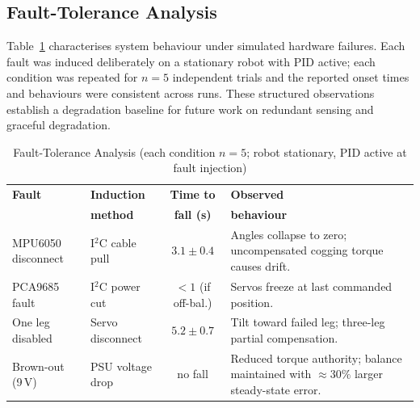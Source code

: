 \documentclass[journal]{IEEEtran}
\begin{document}
\subsection{Fault-Tolerance Analysis}
Table~\ref{tab:fault} characterises system behaviour under
simulated hardware failures.
Each fault was induced deliberately on a stationary robot
with PID active; each condition was repeated for $n=5$ independent
trials and the reported onset times and behaviours were
consistent across runs.
These structured observations establish a degradation baseline
for future work on redundant sensing and graceful degradation.
\begin{table}[!b]
\caption{Fault-Tolerance Analysis (each condition $n=5$;
  robot stationary, PID active at fault injection)}
\label{tab:fault}
\centering
\footnotesize
\setlength{\tabcolsep}{4pt}
\begin{tabular}{p{1.7cm}p{1.5cm}cp{2.8cm}}
\toprule
\textbf{Fault} & \textbf{Induction} & \textbf{Time to} & \textbf{Observed} \\
               & \textbf{method}    & \textbf{fall (s)} & \textbf{behaviour} \\
\midrule
MPU6050 disconnect
  & I$^2$C cable pull
  & $3.1 \pm 0.4$
  & Angles collapse to zero; uncompensated cogging torque causes drift. \\[2pt]
PCA9685 fault
  & I$^2$C power cut
  & $<1$ (if off-bal.)
  & Servos freeze at last commanded position. \\[2pt]
One leg disabled
  & Servo disconnect
  & $5.2 \pm 0.7$
  & Tilt toward failed leg; three-leg partial compensation. \\[2pt]
Brown-out (9\,V)
  & PSU voltage drop
  & no fall
  & Reduced torque authority; balance maintained with $\approx30\%$ larger steady-state error. \\
\bottomrule
\end{tabular}
\end{table}
\end{document}
